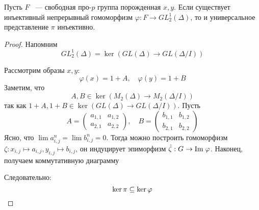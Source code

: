 \vskip 0.1in\noindent
\begin{theorem}[Зубков, 1987]\label{thm:zubkov-universal}
    Пусть $F$ ~--- свободная про-$p$ группа порожденная $x, y$.
    Если существует инъективный непрерывный гомоморфизм $\varphi: F \to GL^1_2(\Delta)$, то и универсальное представление $\pi$ инъективно.
\end{theorem}
\begin{proof}
    Напомним
    \[
        GL^1_2(\Delta) = \ker{(GL(\Delta)\to GL(\Delta/I))}
    \]

    Рассмотрим образы $x, y$:
    \[
        \varphi(x) = 1 + A, \quad
        \varphi(y) = 1 + B
    \]
    Заметим, что
    \[
        A, B \in \ker{(M_2(\Delta)\to M_2(\Delta/I))}
    \]
    так как $1 + A, 1 + B \in \ker{(GL(\Delta) \to GL(\Delta / I))}$.
    Пусть
    \[
        A=
        \begin{pmatrix}
            a_{1,1} & a_{1,2} \\
            a_{2,1} & a_{2,2}
        \end{pmatrix},
        \quad
        B=
        \begin{pmatrix}
            b_{1,1} & b_{1,2} \\
            b_{2,1} & b_{2,2}
        \end{pmatrix}
    \]
    Ясно, что $\lim a_{i,j}^n = \lim b_{i,j}^n = 0$.
    Тогда можно построить гомоморфизм $\zeta: x_{i,j} \mapsto a_{i,j}, y_{i,j} \mapsto b_{i,j}$, он индуцирует эпиморфизм
    $\hat{\zeta}: G \to \mathrm{Im}\hspace{0.1cm}{\varphi}$.
    Наконец, получаем коммутативную диаграмму
    \begin{center}
    \end{center}
    Следовательно:
    \[
        \ker{\pi} \subseteq \ker{\varphi} \qedhere
    \]

\end{proof}

